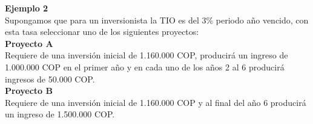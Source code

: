 \textbf{Ejemplo 2}\\

Supongamos que para un inversionista la TIO es del 3\% periodo año vencido, con esta tasa seleccionar uno de los siguientes proyectos:\\

\textbf{Proyecto A}\\
Requiere de una inversión inicial de 1.160.000 COP, producirá un ingreso de 1.000.000 COP en el primer año y en cada uno de los años 2 al 6 producirá ingresos de 50.000 COP.\\

\textbf{Proyecto B}\\
Requiere de una inversión inicial de 1.160.000 COP y al final del año 6 producirá un ingreso de 1.500.000 COP.
\\

